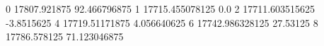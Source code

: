 0 17807.921875 92.466796875
1 17715.455078125 0.0
2 17711.603515625 -3.8515625
4 17719.51171875 4.056640625
6 17742.986328125 27.53125
8 17786.578125 71.123046875
